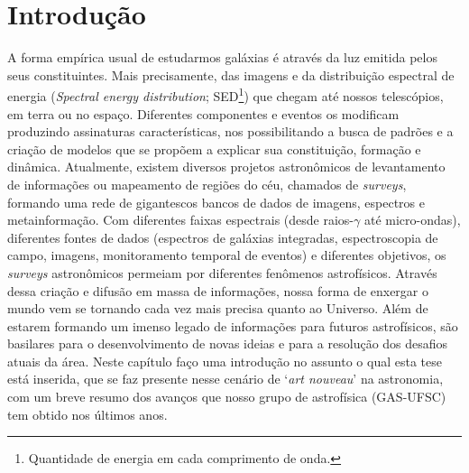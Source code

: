 



\chapter{Introdução}
\label{sec:intro}

A forma empírica usual de estudarmos galáxias é através da luz emitida pelos seus constituintes. Mais precisamente, das imagens e da distribuição espectral de energia ({\em Spectral energy distribution}; SED\footnote{Quantidade de energia em cada comprimento de onda.}) que chegam até nossos telescópios, em terra ou no espaço. Diferentes componentes e eventos os modificam produzindo assinaturas características, nos possibilitando a busca de padrões e a criação de modelos que se propõem a explicar sua constituição, formação e dinâmica. Atualmente, existem diversos projetos astronômicos de levantamento de informações ou mapeamento de regiões do céu, chamados de {\em surveys}, formando uma rede de gigantescos bancos de dados de imagens, espectros e metainformação. Com diferentes faixas espectrais (desde raios-$\gamma$ até micro-ondas), diferentes fontes de dados (espectros de galáxias integradas, espectroscopia de campo, imagens, monitoramento temporal de eventos) e diferentes objetivos, os {\em surveys} astronômicos permeiam por diferentes fenômenos astrofísicos. Através dessa criação e difusão em massa de informações, nossa forma de enxergar o mundo vem se tornando cada vez mais precisa quanto ao Universo. Além de estarem formando um imenso legado de informações para futuros astrofísicos, são basilares para o desenvolvimento de novas ideias e para a resolução dos desafios atuais da área. Neste capítulo faço uma introdução no assunto o qual esta tese está inserida, que se faz presente nesse cenário de `{\em art nouveau}' na astronomia, com um breve resumo dos avanços que nosso grupo de astrofísica (GAS-UFSC) tem obtido nos últimos anos.



